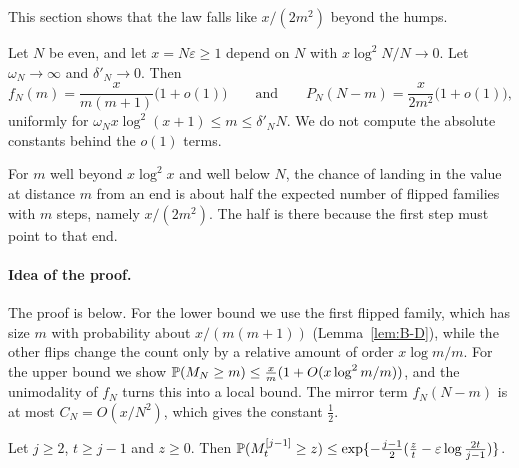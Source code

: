 This section shows that the law falls like $x/(2m^2)$ beyond the humps.

\begin{theorem}\label{thm:profile}
Let $N$ be even, and let $x=N\varepsilon\ge1$ depend on $N$ with
$x\log^2N/N\to0$. Let $\omega_N\to\infty$ and $\delta'_N\to0$. Then
\[
 f_N(m)=\frac{x}{m(m+1)}\bigl(1+o(1)\bigr)\qquad\text{and}\qquad
 P_N(N-m)=\frac{x}{2m^2}\bigl(1+o(1)\bigr),
\]
uniformly for $\omega_Nx\log^2(x+1)\le m\le\delta'_NN$. We do not compute
the absolute constants behind the $o(1)$ terms.
\end{theorem}

For $m$ well beyond $x\log^2x$ and well below $N$, the chance of landing in the
value at distance $m$ from an end is about half the expected number of flipped families with $m$
steps, namely $x/(2m^2)$. The half is there because the first step must point to that end.

\paragraph{Idea of the proof.}
The proof is below. For the lower bound we use the
first flipped family, which has size $m$ with probability about
$x/(m(m+1))$ (Lemma~\ref{lem:B-D}), while the other flips change the count
only by a relative amount of order $x\log m/m$. For the upper bound we show
$\mathbb{P}(M_N\ge m)\le\frac xm(1+O(x\log^2m/m))$, and the unimodality of $f_N$
turns this into a local bound. The mirror term $f_N(N-m)$ is at most
$C_N=O(x/N^2)$, which gives the constant $\frac12$.

\begin{lemma}\label{lem:B-late}
Let $j\ge2$, $t\ge j-1$ and $z\ge0$. Then $\mathbb{P}(M^{[j-1]}_t\ge
z)\le\exp\{-\frac{j-1}{2}(\frac zt-\varepsilon\log\frac{2t}{j-1})\}$.
\end{lemma}

